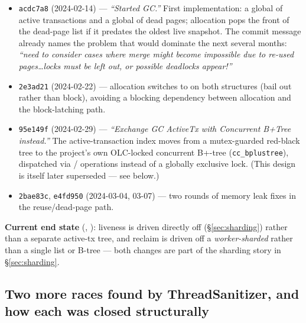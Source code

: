 \documentclass[11pt]{article}
\newcommand{\commit}[1]{\texttt{#1}}
\begin{document}
\begin{itemize}
  \item \commit{acdc7a8} (2024-02-14) --- \emph{``Started GC.''} First implementation:
        a global  of active transactions and a global
         of dead pages; allocation
        pops the front of the dead-page list if it predates the oldest live snapshot.
        The commit message already names the problem that would dominate the next
        several months: \emph{``need to consider cases where merge might become
        impossible due to re-used pages\ldots locks must be left out, or possible
        deadlocks appear!''}
  \item \commit{2e3ad21} (2024-02-22) --- allocation switches to  on
        both structures (bail out rather than block), avoiding a blocking dependency
        between allocation and the block-latching path.
  \item \commit{95e149f} (2024-02-29) --- \emph{``Exchange GC ActiveTx with Concurrent
        B+Tree instead.''} The active-transaction index moves from a mutex-guarded
        red-black tree to the project's own OLC-locked concurrent B+-tree
        (\texttt{cc\_bplustree}), dispatched via /
        operations instead of a globally exclusive lock. (This design is itself later
        superseded --- see below.)
  \item \commit{2bae83c}, \commit{e4fd950} (2024-03-04, 03-07) --- two rounds of memory
        leak fixes in the reuse/dead-page path.
\end{itemize}

\textbf{Current end state} (,
): liveness is driven directly off
 (\S\ref{sec:sharding}) rather than a separate
active-tx tree, and reclaim is driven off a \emph{worker-sharded}  rather
than a single list or B-tree --- both changes are part of the sharding story in
\S\ref{sec:sharding}.

\subsection{Two more races found by ThreadSanitizer, and how each was closed structurally}
\end{document}
